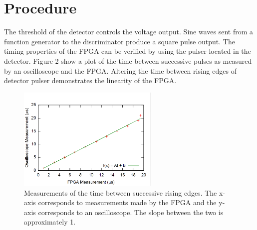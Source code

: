 \documentclass[12pt]{article}
\begin{document}
\section{Procedure}
The threshold of the detector controls the voltage output. Sine waves sent from a function generator to the discriminator produce a square pulse output. The timing properties of the FPGA can be verified by using the pulser located in the detector. Figure 2 show a plot of the time between successive pulses as measured by an oscilloscope and the FPGA. Altering the time between rising edges of detector pulser demonstrates the linearity of the FPGA.  



\begin{figure}[h]
\begin{center}
 \quad \includegraphics[width=0.6\textwidth]{FPGA_linearity}
\end{center}
\caption{ Measurements of the time between successive rising edges. The x-axis corresponds to measurements made by the FPGA and the y-axis corresponds to an oscilloscope. The slope between the two is approximately 1.}
\label{fig:linear}
\end{figure}
\end{document}
